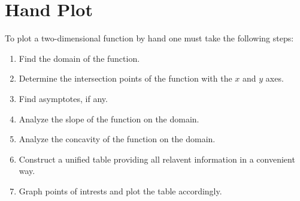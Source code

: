 \section{Hand Plot}

To plot a two-dimensional function by hand one must take the following steps:
\begin{enumerate}
    \item Find the domain of the function.
    \item Determine the intersection points of the function with the $x$
          and $y$ axes.
    \item Find asymptotes, if any.
    \item Analyze the slope of the function on the domain.
    \item Analyze the concavity of the function on the domain.
    \item Construct a unified table providing all relavent information in a
          convenient way.
    \item Graph points of intrests and plot the table accordingly.
\end{enumerate}












